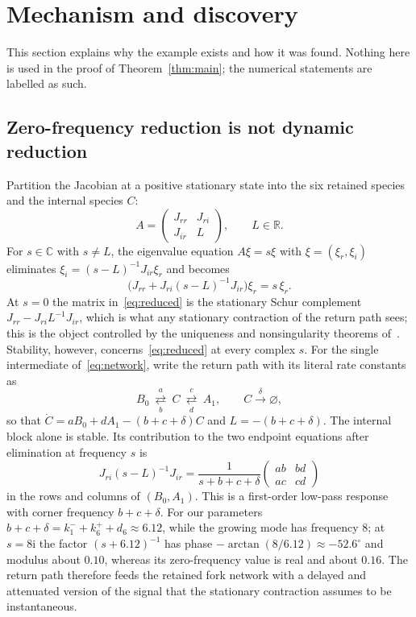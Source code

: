 \documentclass[11pt,a4paper]{article}
\theoremstyle{plain}
\theoremstyle{definition}
\theoremstyle{remark}
\numberwithin{equation}{section}
\newcommand{\R}{\mathbb{R}}
\newcommand{\C}{\mathbb{C}}
\newcommand{\iu}{\mathrm{i}}
\begin{document}
\section{Mechanism and discovery}\label{sec:mechanism}

This section explains why the example exists and how it was found. Nothing here is used in the proof of Theorem~\ref{thm:main}; the numerical statements are labelled as such.

\subsection{Zero-frequency reduction is not dynamic reduction}\label{subsec:transfer}
Partition the Jacobian at a positive stationary state into the six retained species and the internal species $C$:
\[
A=\begin{pmatrix}J_{rr}&J_{ri}\\ J_{ir}&L\end{pmatrix},\qquad L\in\R .
\]
For $s\in\C$ with $s\ne L$, the eigenvalue equation $A\xi=s\xi$ with $\xi=(\xi_r,\xi_i)$ eliminates $\xi_i=(s-L)^{-1}J_{ir}\xi_r$ and becomes
\begin{equation}\label{eq:reduced}
\bigl(J_{rr}+J_{ri}(s-L)^{-1}J_{ir}\bigr)\xi_r=s\,\xi_r .
\end{equation}
At $s=0$ the matrix in~\eqref{eq:reduced} is the stationary Schur complement $J_{rr}-J_{ri}L^{-1}J_{ir}$, which is what any stationary contraction of the return path sees; this is the object controlled by the uniqueness and nonsingularity theorems of~\cite{TypeIIpos,TypeIImixed}. Stability, however, concerns~\eqref{eq:reduced} at every complex $s$. For the single intermediate of~\eqref{eq:network}, write the return path with its literal rate constants as
\[
B_0\ \overset{a}{\underset{b}{\rightleftarrows}}\ C\ \overset{c}{\underset{d}{\rightleftarrows}}\ A_1,\qquad C\xrightarrow{\ \delta\ }\varnothing,
\]
so that $\dot C=aB_0+dA_1-(b+c+\delta)C$ and $L=-(b+c+\delta)$. The internal block alone is stable. Its contribution to the two endpoint equations after elimination at frequency $s$ is
\begin{equation}\label{eq:transfer}
J_{ri}(s-L)^{-1}J_{ir}=\frac{1}{s+b+c+\delta}\begin{pmatrix}ab&bd\\ ac&cd\end{pmatrix}
\end{equation}
in the rows and columns of $(B_0,A_1)$. This is a first-order low-pass response with corner frequency $b+c+\delta$. For our parameters $b+c+\delta=k_1^-+k_6^++d_6\approx6.12$, while the growing mode has frequency $8$; at $s=8\iu$ the factor $(s+6.12)^{-1}$ has phase $-\arctan(8/6.12)\approx-52.6^\circ$ and modulus about $0.10$, whereas its zero-frequency value is real and about $0.16$. The return path therefore feeds the retained fork network with a delayed and attenuated version of the signal that the stationary contraction assumes to be instantaneous.
\end{document}
